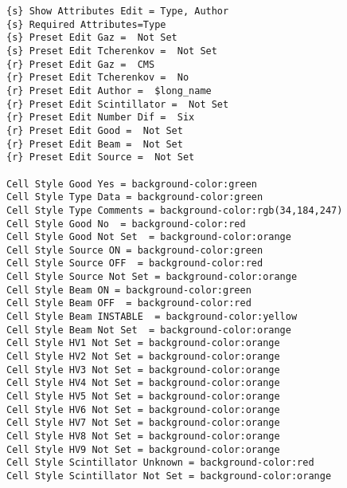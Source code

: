 {\begin{lstlisting}[breaklines=true,basicstyle=\tiny,postbreak=\mbox{\textcolor{red}{$\hookrightarrow$}\space},]
{s} Show Attributes Edit = Type, Author
{s} Required Attributes=Type
{s} Preset Edit Gaz =  Not Set
{s} Preset Edit Tcherenkov =  Not Set
{r} Preset Edit Gaz =  CMS
{r} Preset Edit Tcherenkov =  No
{r} Preset Edit Author =  $long_name
{r} Preset Edit Scintillator =  Not Set
{r} Preset Edit Number Dif =  Six
{r} Preset Edit Good =  Not Set
{r} Preset Edit Beam =  Not Set
{r} Preset Edit Source =  Not Set

Cell Style Good Yes = background-color:green
Cell Style Type Data = background-color:green
Cell Style Type Comments = background-color:rgb(34,184,247)
Cell Style Good No  = background-color:red
Cell Style Good Not Set  = background-color:orange
Cell Style Source ON = background-color:green
Cell Style Source OFF  = background-color:red
Cell Style Source Not Set = background-color:orange
Cell Style Beam ON = background-color:green
Cell Style Beam OFF  = background-color:red
Cell Style Beam INSTABLE  = background-color:yellow
Cell Style Beam Not Set  = background-color:orange
Cell Style HV1 Not Set = background-color:orange
Cell Style HV2 Not Set = background-color:orange
Cell Style HV3 Not Set = background-color:orange
Cell Style HV4 Not Set = background-color:orange
Cell Style HV5 Not Set = background-color:orange
Cell Style HV6 Not Set = background-color:orange
Cell Style HV7 Not Set = background-color:orange
Cell Style HV8 Not Set = background-color:orange
Cell Style HV9 Not Set = background-color:orange
Cell Style Scintillator Unknown = background-color:red
Cell Style Scintillator Not Set = background-color:orange


\end{lstlisting}}

